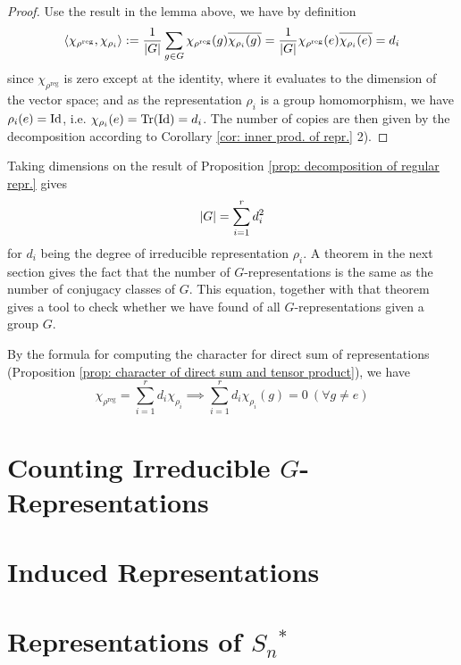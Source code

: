 \documentclass{article}
\begin{document}
\begin{proof}
    Use the result in the lemma above, we have by definition
    \[
        \left\langle \chi_{\rho^{\mathrm{reg}}}, \chi_{\rho_i} \right\rangle := \frac{1}{\left|G\right|} \sum_{g \in G} \chi_{\rho^{\mathrm{reg}}}(g) \overline{\chi_{\rho_i}(g)} = \frac{1}{\left|G\right|} \chi_{\rho^{\mathrm{reg}}}(e) \overline{\chi_{\rho_i}(e)} = d_i
    \]
    since $\chi_{\rho^{\mathrm{reg}}}$ is zero except at the identity, where it evaluates to the dimension of the vector space; and as the representation $\rho_i$ is a group homomorphism, we have $\rho_i(e) = \mathrm{Id}$, i.e. $\chi_{\rho_i}(e) = \mathrm{Tr}(\mathrm{Id}) = d_i$. The number of copies are then given by the decomposition according to Corollary \ref{cor: inner prod. of repr.} 2).
\end{proof}

\begin{corollary}\label{cor: check whether obtained all irred reor.}
    Taking dimensions on the result of Proposition \ref{prop: decomposition of regular repr.} gives
    \[
        \left|G\right| = \sum_{i = 1}^r d_i^2
    \]
    for $d_i$ being the degree of irreducible representation $\rho_i$. A theorem in the next section gives the fact that the number of $G$-representations is the same as the number of conjugacy classes of $G$. This equation, together with that theorem gives a tool to check whether we have found of all $G$-representations given a group $G$. 
\end{corollary}

\begin{corollary}
    By the formula for computing the character for direct sum of representations (Proposition \ref{prop: character of direct sum and tensor product}), we have 
    \[
        \chi_{\rho^{\mathrm{reg}}} = \sum_{i = 1}^r d_i \chi_{\rho_i} \implies \sum_{i = 1}^r d_i \chi_{\rho_i}(g) = 0\ (\forall g \neq e)
    \]
\end{corollary}

\section{Counting Irreducible $G$-Representations}

\section{Induced Representations}

\section{Representations of $S_n$$^{\ast}$}
\end{document}
